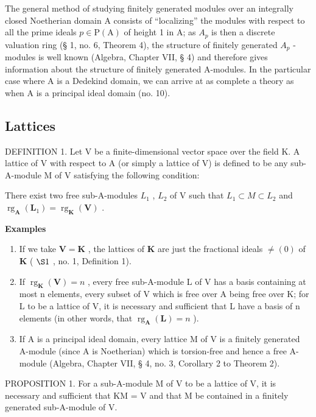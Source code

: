 The general method of studying finitely generated modules over an integrally closed Noetherian domain A consists of ``localizing'' the modules with respect to all the prime ideals \(p \in \mathrm{P}(\mathrm{A})\) of height 1 in A; as \(A_{p}\) is then a discrete valuation ring (§ 1, no. 6, Theorem 4), the structure of finitely generated \(A_{p}\) -modules is well known (Algebra, Chapter VII, § 4) and therefore gives information about the structure of finitely generated A-modules. In the particular case where A is a Dedekind domain, we can arrive at as complete a theory as when A is a principal ideal domain (no. 10).

\subsection{Lattices}

DEFINITION 1. Let V be a finite-dimensional vector space over the field K. A lattice of V with respect to A (or simply a lattice of V) is defined to be any sub-A-module M of V satisfying the following condition:

There exist two free sub-A-modules \(L_{1}\) , \(L_{2}\) of V such that \(L_{1} \subset M \subset L_{2}\) and \(\operatorname{rg}_{\mathbf{A}}(\mathbf{L}_{1}) = \operatorname{rg}_{\mathbf{K}}(\mathbf{V})\) .

\textbf{Examples}\par

\begin{enumerate}
\def\labelenumi{(\arabic{enumi})}
\item
  If we take \(\mathbf{V} = \mathbf{K}\) , the lattices of \(\mathbf{K}\) are just the fractional ideals \(\neq (0)\) of \(\mathbf{K}\) ( \(\S 1\) , no. 1, Definition 1).
\item
  If \(\operatorname{rg}_{\mathbf{K}}(\mathbf{V}) = n\) , every free sub-A-module L of V has a basis containing at most n elements, every subset of V which is free over A being free over K; for L to be a lattice of V, it is necessary and sufficient that L have a basis of n elements (in other words, that \(\operatorname{rg}_{\mathbf{A}}(\mathbf{L}) = n\) ).
\item
  If A is a principal ideal domain, every lattice M of V is a finitely generated A-module (since A is Noetherian) which is torsion-free and hence a free A-module (Algebra, Chapter VII, § 4, no. 3, Corollary 2 to Theorem 2).
\end{enumerate}

PROPOSITION 1. For a sub-A-module M of V to be a lattice of V, it is necessary and sufficient that KM = V and that M be contained in a finitely generated sub-A-module of V.

